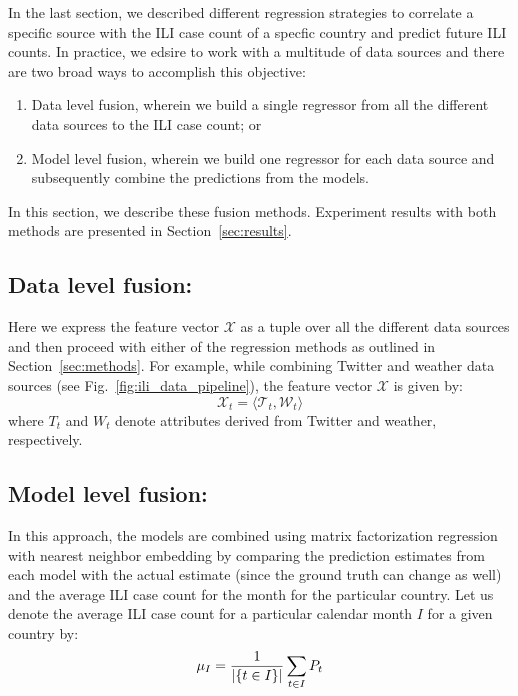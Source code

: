 In the last section, we described different regression strategies to correlate
a specific source with the ILI case count of a specfic country and predict
future ILI counts. In practice, we edsire to work with a multitude of data
sources and there are two broad ways to accomplish this objective:

\begin{enumerate}
  \item Data level fusion, wherein we build a single regressor from all the different data
    sources to the ILI case count; or
  \item Model level fusion, wherein we build one regressor for each data source and 
    subsequently combine the predictions from the models.
\end{enumerate}

In this section, we describe these fusion methods. Experiment results with 
both methods are presented in Section~\ref{sec:results}.

\subsection{\label{sec:fusion:data} Data level fusion:}
Here we express the feature vector $\mathcal{X}$ as a tuple over all the different data 
sources and then proceed with either of the regression methods as outlined in Section~\ref{sec:methods}.
For example, while combining Twitter and weather data sources (see Fig.~\ref{fig:ili_data_pipeline}), the 
feature vector $\mathcal{X}$ is given by:
\[\mathcal{X}_t = \langle \mathcal{T}_t, \mathcal{W}_t \rangle
\]
where $T_t$ and $W_t$ denote attributes derived from Twitter and weather, respectively.

\subsection{\label{sec:fusion:model} Model level fusion:}
In this approach, the models are combined using matrix factorization regression with 
nearest neighbor embedding by comparing the
prediction estimates from each model with the actual estimate (since the ground truth
can change as well) and the average
ILI case count for the month for the particular country.
Let us denote the average ILI case count for a particular calendar 
month $I$ for a given country by:
\begin{equation*}
  \mu_I = {1 \over {|\lbrace t \in I\rbrace|}} \sum_{t \in I}P_{t}
\end{equation*}

